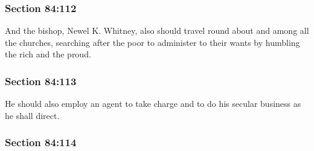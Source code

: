 
	\subsubsection{Section 84:112} %
		\label{DC84-112}

		And the bishop, Newel K. Whitney, also should travel round about and among all the churches, searching after the poor to administer to their wants by humbling the rich and the proud.


	\subsubsection{Section 84:113} %
		\label{DC84-113}

		He should also employ an agent to take charge and to do his secular business as he shall direct.


	\subsubsection{Section 84:114} %
		\label{DC84-114}

